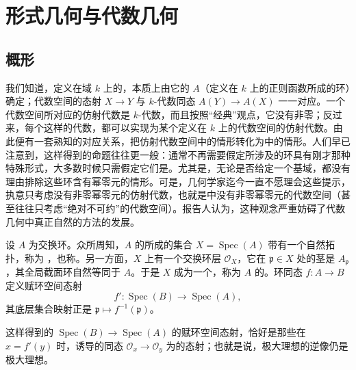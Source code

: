 \chapter{形式几何与代数几何}

\section{概形}
我们知道，定义在域 $k$ 上的，本质上由它的 $A$（定义在 $k$ 上的正则函数所成的环）确定；代数空间的态射 $X\to Y$ 与 $k$-代数同态 $A(Y)\to A(X)$ 一一对应。一个代数空间所对应的仿射代数是 $k$-代数，而且按照“经典”观点，它没有非零；反过来，每个这样的代数，都可以实现为某个定义在 $k$ 上的代数空间的仿射代数。由此便有一套熟知的对应关系，把仿射代数空间中的情形转化为中的情形。人们早已注意到，这样得到的命题往往更一般：通常不再需要假定所涉及的环具有刚才那种特殊形式，大多数时候只需假定它们是。尤其是，无论是否给定一个基域，都没有理由排除这些环含有幂零元的情形。可是，几何学家迄今一直不愿理会这些提示，执意只考虑没有非零幂零元的仿射代数，也就是中没有非零幂零元的代数空间（甚至往往只考虑“绝对不可约”的代数空间）。报告人认为，这种观念严重妨碍了代数几何中真正自然的方法的发展。

设 $A$ 为交换环。众所周知，$A$ 的所成的集合 $X=\operatorname{Spec}(A)$ 带有一个自然拓扑，称为 ，也称。另一方面，$X$ 上有一个交换环层 $\mathcal O_X$，它在 $\mathfrak p\in X$ 处的茎是 $A_{\mathfrak p}$，其全局截面环自然等同于 $A$。于是 $X$ 成为一个，称为 $A$ 的。环同态 $f:A\to B$ 定义赋环空间态射
\[
f':\operatorname{Spec}(B)\longrightarrow\operatorname{Spec}(A),
\]
其底层集合映射正是 $\mathfrak p\mapsto f^{-1}(\mathfrak p)$。

这样得到的 $\operatorname{Spec}(B)\to\operatorname{Spec}(A)$ 的赋环空间态射，恰好是那些在 $x=f'(y)$ 时，诱导的同态 $\mathcal O_x\to\mathcal O_y$ 为的态射；也就是说，极大理想的逆像仍是极大理想。

